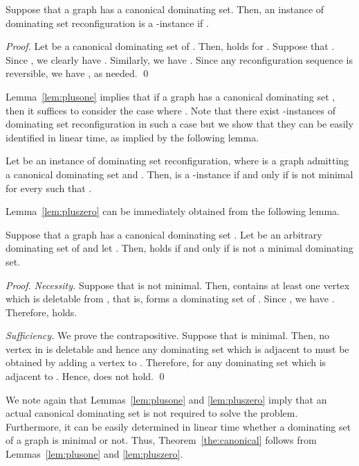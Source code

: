 \documentclass{llncs}
\begin{document}
\begin{lemma} \label{lem:plusone}
Suppose that a graph  has a canonical dominating set.
Then, an instance  of {\sc dominating set reconfiguration} is a -instance if .
\end{lemma}

\begin{proof}
Let  be a canonical dominating set of .
Then,  holds for .
Suppose that .
Since , we clearly have .
Similarly, we have .
Since any reconfiguration sequence is reversible, we have , as needed.
\qed
\end{proof}
	
Lemma~\ref{lem:plusone} implies that if a graph  has a canonical
dominating set , then it suffices to consider the case where .
Note that there exist -instances of {\sc dominating set reconfiguration} in
such a case but we show that they can be easily identified in linear time, as implied by the following lemma.

\begin{lemma} \label{lem:pluszero}
Let  be an instance of {\sc dominating set reconfiguration},
where  is a graph admitting a canonical dominating set and .
Then,  is a -instance if and only if
 is not minimal for every  such that .
\end{lemma}

Lemma~\ref{lem:pluszero} can be immediately obtained from the following lemma.

\begin{lemma} \label{lem:minimal}
Suppose that a graph  has a canonical dominating set .
Let  be an arbitrary dominating set of  and let .
Then,  holds if and only if  is not a minimal dominating set.
\end{lemma}

\begin{proof}
{\em Necessity.}
Suppose that  is not minimal.
Then,  contains at least one vertex  which is deletable
from , that is,  forms a dominating set of .
Since , we have .
Therefore,  holds.

\noindent	
{\em Sufficiency.}
We prove the contrapositive.
Suppose that  is minimal.
Then, no vertex in  is deletable and hence any dominating
set  which is adjacent to  must be obtained by adding a vertex to .
Therefore,  for any dominating
set  which is adjacent to . Hence,  does not hold.
\qed
\end{proof}
	
We note again that Lemmas~\ref{lem:plusone} and \ref{lem:pluszero} imply that
an actual canonical dominating set is not required to solve the problem.
Furthermore, it can be easily determined in linear time whether a dominating set of a graph  is minimal or not.
Thus, Theorem~\ref{the:canonical} follows from Lemmas~\ref{lem:plusone} and \ref{lem:pluszero}.
\medskip
\end{document}
